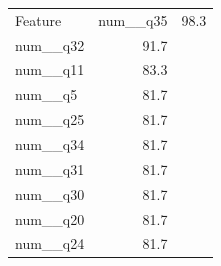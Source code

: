 \begin{tabular}{lr}
\toprule
Feature & %
\midrule
num__q35 & 98.3 \\
num__q32 & 91.7 \\
num__q11 & 83.3 \\
num__q5 & 81.7 \\
num__q25 & 81.7 \\
num__q34 & 81.7 \\
num__q31 & 81.7 \\
num__q30 & 81.7 \\
num__q20 & 81.7 \\
num__q24 & 81.7 \\
\bottomrule
\end{tabular}
